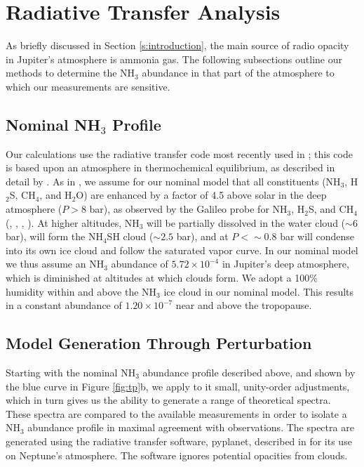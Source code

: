 \documentclass{article}
\newcommand{\e}[1]{\times 10^{#1}}
\begin{document}
\section{Radiative Transfer Analysis} \label{s:model}

	As briefly discussed in Section \ref{s:introduction}, the main source of radio opacity in Jupiter's atmosphere is ammonia gas.
	The following subsections outline our methods to determine the NH$_{3}$ abundance in that part of the atmosphere to which our measurements are sensitive.

\subsection{Nominal NH$_{3}$ Profile}

	Our calculations use the radiative transfer code most recently used in \citealt{2016Sci...352.1198D}; this code is based upon an atmosphere in thermochemical equilibrium, as described in detail by \citealt{2005Icar..173..425D}.
	As in \citealt{2016Sci...352.1198D}, we assume for our nominal model that all constituents (NH$_{3}$, H$_{2}$S, CH$_{4}$, and H$_{2}$O) are enhanced by a factor of 4.5 above solar in the deep atmosphere ($P > 8$ bar), as observed by the Galileo probe for NH$_{3}$, H$_{2}$S, and CH$_{4}$ (\citealt{1998JGR...10322847F}, \citealt{1999BAAS...31.1154M}, \citealt{1998JGR...10322929S}, \citealt{2004Icar..171..153W}).
	At higher altitudes, NH$_{3}$ will be partially dissolved in the water cloud ($\sim 6$ bar), will form the NH$_{4}$SH cloud ($\sim 2.5$ bar), and at $P < \sim 0.8$ bar will condense into its own ice cloud and follow the saturated vapor curve.
	In our nominal model we thus assume an NH$_{3}$ abundance of $5.72 \e{-4}$ in Jupiter's deep atmosphere, which is diminished at altitudes at which clouds form.
	We adopt a 100\% humidity within and above the NH$_{3}$ ice cloud in our nominal model.
	This results in a constant abundance of $1.20\e{-7}$ near and above the tropopause.

\subsection{Model Generation Through Perturbation}

	Starting with the nominal NH$_{3}$ abundance profile described above, and shown by the blue curve in Figure \ref{fig:tp}b, we apply to it small, unity-order adjustments, which in turn gives us the ability to generate a range of theoretical spectra.
	These spectra are compared to the available measurements in order to isolate a NH$_{3}$ abundance profile in maximal agreement with observations.
	The spectra are generated using the radiative transfer software, pyplanet, described in \citealt{2014Icar..237..211D} for its use on Neptune's atmosphere. The software ignores potential opacities from clouds.
\end{document}
